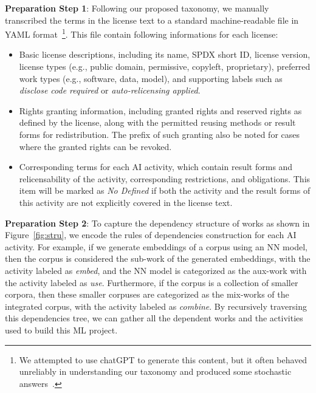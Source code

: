 \textbf{Preparation Step 1}: Following our proposed taxonomy, we manually transcribed the terms in the license text to a standard machine-readable file in YAML format~\footnote{We attempted to use chatGPT to generate this content, but it often behaved unreliably in understanding our taxonomy and produced some stochastic answers~\cite{bender2021dangers}.}.
This file contain following informations for each license:
\begin{itemize}
    \item Basic license descriptions, including its name, SPDX short ID, license version, license types (e.g., public domain, permissive, copyleft, proprietary), preferred work types (e.g., software, data, model), and supporting labels such as \textit{disclose code required} or \textit{auto-relicensing applied}.
    
    \item Rights granting information, including granted rights and reserved rights as defined by the license, along with the permitted reusing methods or result forms for redistribution.
    The prefix of such granting also be noted for cases where the granted rights can be revoked.

    \item Corresponding terms for each AI activity, which contain result forms and relicensability of the activity, corresponding restrictions, and obligations. 
    This item will be marked as \textit{No Defined} if both the activity and the result forms of this activity are not explicitly covered in the license text.
\end{itemize}

\textbf{Preparation Step 2}:
To capture the dependency structure of works as shown in Figure~\ref{fig:stru}, we encode the rules of dependencies construction for each AI activity.
For example, if we generate embeddings of a corpus using an NN model, then the corpus is considered the sub-work of the generated embeddings, with the activity labeled as \textit{embed}, and the NN model is categorized as the aux-work with the activity labeled as \textit{use}.
Furthermore, if the corpus is a collection of smaller corpora, then these smaller corpuses are categorized as the mix-works of the integrated corpus, with the activity labeled as \textit{combine}.
By recursively traversing this dependencies tree, we can gather all the dependent works and the activities used to build this ML project.

